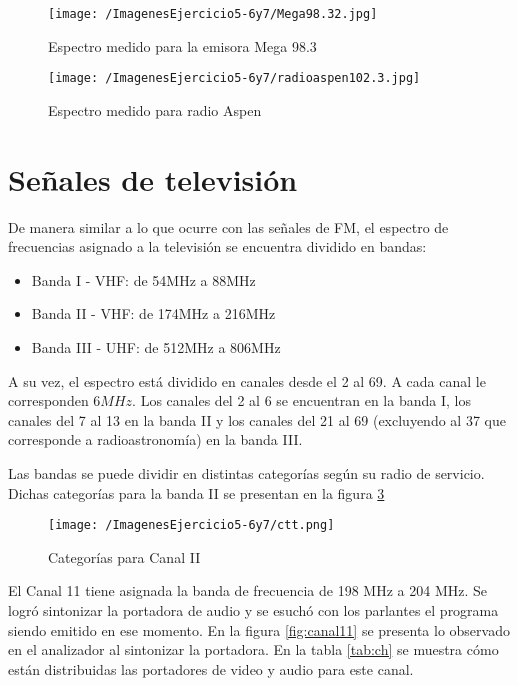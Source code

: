 \begin{figure}[H]
	\centering
	\texttt{[image: /ImagenesEjercicio5-6y7/Mega98.32.jpg]}
\caption{Espectro medido para la emisora Mega 98.3}
	\label{fig:mega}
\end{figure}

\begin{figure}[H]
	\centering
	\texttt{[image: /ImagenesEjercicio5-6y7/radioaspen102.3.jpg]}
\caption{Espectro medido para radio Aspen}
	\label{fig:aspen}
\end{figure}



\section{Señales de televisión}

De manera similar a lo que ocurre con las señales de FM, el espectro de frecuencias asignado a la televisión se encuentra dividido en bandas:
\begin{itemize}
    \item Banda I - VHF: de 54MHz a 88MHz 
    \item Banda II - VHF: de 174MHz a 216MHz 
    \item Banda III - UHF: de 512MHz a 806MHz
\end{itemize}

A su vez, el espectro está dividido en canales desde el 2 al 69. A cada canal le corresponden $6 MHz$. Los canales del 2 al 6 se encuentran en la banda I, los canales del 7 al 13 en la banda II y los canales del 21 al 69 (excluyendo al 37 que corresponde a radioastronomía) en la banda III.

Las bandas se puede dividir en distintas categorías según su radio de servicio. Dichas categorías para la banda II se presentan en la figura \ref{fig:ctt}

\begin{figure}[H]
	\centering
	\texttt{[image: /ImagenesEjercicio5-6y7/ctt.png]}
	\caption{Categorías para Canal II}	
	\label{fig:ctt}
\end{figure}

El Canal 11 tiene asignada la banda de frecuencia de 198 MHz a 204 MHz. Se logró sintonizar la portadora de audio y se esuchó con los parlantes el programa siendo emitido en ese momento. En la figura \ref{fig:canal11} se presenta lo observado en el analizador al sintonizar la portadora. En la tabla \ref{tab:ch} se muestra cómo están distribuidas las portadores de video y audio para este canal.


